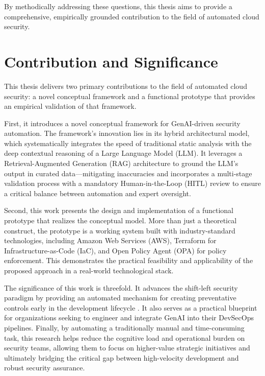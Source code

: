 By methodically addressing these questions, this thesis aims to provide a comprehensive, empirically grounded contribution to the field of automated cloud security.

\section{Contribution and Significance}
\label{sec:contribution}

This thesis delivers two primary contributions to the field of automated cloud security: a novel conceptual framework and a functional prototype that provides an empirical validation of that framework.

First, it introduces a novel conceptual framework for GenAI-driven security automation. The framework's innovation lies in its hybrid architectural model, which systematically integrates the speed of traditional static analysis with the deep contextual reasoning of a Large Language Model (LLM). It leverages a Retrieval-Augmented Generation (RAG) architecture to ground the LLM's output in curated data—mitigating inaccuracies and incorporates a multi-stage validation process with a mandatory Human-in-the-Loop (HITL) review to ensure a critical balance between automation and expert oversight.

Second, this work presents the design and implementation of a functional prototype that realizes the conceptual model. More than just a theoretical construct, the prototype is a working system built with industry-standard technologies, including Amazon Web Services (AWS), Terraform for Infrastructure-as-Code (IaC), and Open Policy Agent (OPA) for policy enforcement. This demonstrates the practical feasibility and applicability of the proposed approach in a real-world technological stack.

The significance of this work is threefold. It advances the shift-left security paradigm by providing an automated mechanism for creating preventative controls early in the development lifecycle \cite{akto_shift_2025}. It also serves as a practical blueprint for organizations seeking to engineer and integrate GenAI into their DevSecOps pipelines. Finally, by automating a traditionally manual and time-consuming task, this research helps reduce the cognitive load and operational burden on security teams, allowing them to focus on higher-value strategic initiatives and ultimately bridging the critical gap between high-velocity development and robust security assurance.

